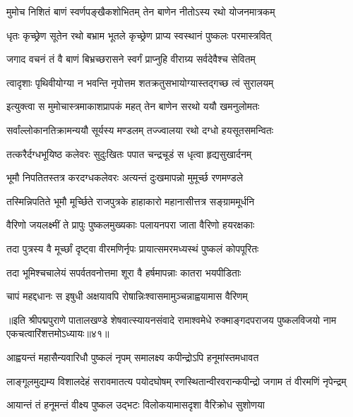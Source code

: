 \twolineshloka
{मुमोच निशितं बाणं स्वर्णपङ्खैकशोभितम्}
{तेन बाणेन नीतोऽस्य रथो योजनमात्रकम्}%

\twolineshloka
{धृतः कृच्छ्रेण सूतेन रथो बभ्राम भूतले}
{कृच्छ्रेण प्राप्य स्वस्थानं पुष्कलः परमास्त्रवित्}%

\twolineshloka
{जगाद वचनं तं वै बाणं बिभ्रच्छरासने}
{स्वर्गं प्राप्नुहि वीराग्र्य सर्वदेवैश्च सेवितम्}%

\twolineshloka
{त्वादृशाः पृथिवीयोग्या न भवन्ति नृपोत्तम}
{शतक्रतुसभायोग्यास्तद्गच्छ त्वं सुरालयम्}%

\twolineshloka
{इत्युक्त्वा स मुमोचास्त्रमाकाशप्रापकं महत्}
{तेन बाणेन सरथो ययौ खमनुलोमतः}%

\twolineshloka
{सर्वांल्लोकानतिक्रामन्ययौ सूर्यस्य मण्डलम्}
{तज्ज्वालया रथो दग्धो हयसूतसमन्वितः}%

\twolineshloka
{तत्करैर्दग्धभूयिष्ठ कलेवरः सुदुःखितः}
{पपात चन्द्रचूडं स धृत्वा हृद्यसुखार्दनम्}%

\twolineshloka
{भूमौ निपतितस्तत्र करदग्धकलेवरः}
{अत्यन्तं दुःखमापन्नो मुमूर्च्छ रणमण्डले}%

\twolineshloka
{तस्मिन्निपतिते भूमौ मूर्च्छिते राजपुत्रके}
{हाहाकारो महानासीत्तत्र सङ्ग्राममूर्धनि}%

\twolineshloka
{वैरिणो जयलक्ष्मीं ते प्रापुः पुष्कलमुख्यकाः}
{पलायनपरा जाता वैरिणो हयरक्षकाः}%

\twolineshloka
{तदा पुत्रस्य वै मूर्च्छां दृष्ट्वा वीरमणिर्नृपः}
{प्रायात्समरमध्यस्थं पुष्कलं कोपपूरितः}%

\twolineshloka
{तदा भूमिश्चचालेयं सपर्वतवनोत्तमा}
{शूरा वै हर्षमापन्नाः कातरा भयपीडिताः}%

\twolineshloka
{चापं महद्दधानः स इषुधी अक्षयावपि}
{रोषान्निःश्वासमामुञ्चन्नाह्वयामास वैरिणम्}%

{॥इति श्रीपद्मपुराणे पातालखण्डे शेषवात्स्यायनसंवादे रामाश्वमेधे रुक्माङ्गदपराजय पुष्कलविजयो नाम एकचत्वारिंशत्तमोऽध्यायः॥४१॥}



\twolineshloka
{आह्वयन्तं महासैन्यवारिधौ पुष्कलं नृपम्}
{समालक्ष्य कपीन्द्रोऽपि हनूमांस्तमधावत}%

\fourlineindentedshloka
{लाङ्गूलमुद्यम्य विशालदेहं}
{सरावमातत्य पयोदघोषम्}
{रणस्थितान्वीरवरान्कपीन्द्रो}
{जगाम तं वीरमणिं नृपेन्द्रम्}%

\twolineshloka
{आयान्तं तं हनूमन्तं वीक्ष्य पुष्कल उद्भटः}
{विलोकयामासदृशा वैरिक्रोध सुशोणया}%


